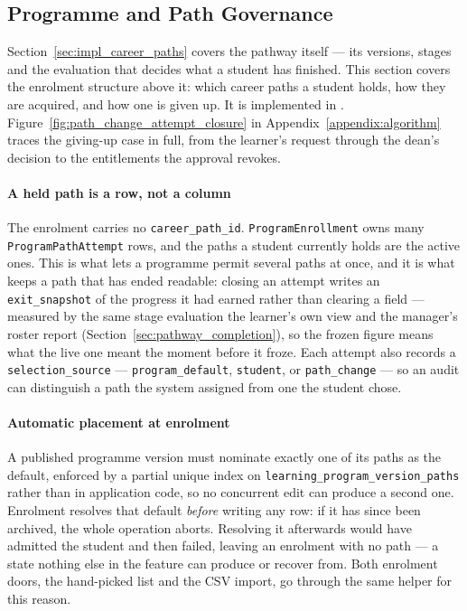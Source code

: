 \subsection{Programme and Path Governance}
\label{sec:impl_path_governance}

Section~\ref{sec:impl_career_paths} covers the pathway itself --- its versions, stages and the evaluation that decides what a student has finished. This section covers the enrolment structure above it: which career paths a student holds, how they are acquired, and how one is given up. It is implemented in . Figure~\ref{fig:path_change_attempt_closure} in Appendix~\ref{appendix:algorithm} traces the giving-up case in full, from the learner's request through the dean's decision to the entitlements the approval revokes.

\paragraph{A held path is a row, not a column}
The enrolment carries no \texttt{career\_path\_id}. \texttt{ProgramEnrollment} owns many \texttt{ProgramPathAttempt} rows, and the paths a student currently holds are the active ones. This is what lets a programme permit several paths at once, and it is what keeps a path that has ended readable: closing an attempt writes an \texttt{exit\_snapshot} of the progress it had earned rather than clearing a field --- measured by the same stage evaluation the learner's own view and the manager's roster report (Section~\ref{sec:pathway_completion}), so the frozen figure means what the live one meant the moment before it froze. Each attempt also records a \texttt{selection\_source} --- \texttt{program\_default}, \texttt{student}, or \texttt{path\_change} --- so an audit can distinguish a path the system assigned from one the student chose.

\paragraph{Automatic placement at enrolment}
A published programme version must nominate exactly one of its paths as the default, enforced by a partial unique index on \texttt{learning\_program\_version\_paths} rather than in application code, so no concurrent edit can produce a second one. Enrolment resolves that default \emph{before} writing any row: if it has since been archived, the whole operation aborts. Resolving it afterwards would have admitted the student and then failed, leaving an enrolment with no path --- a state nothing else in the feature can produce or recover from. Both enrolment doors, the hand-picked list and the CSV import, go through the same helper for this reason.

